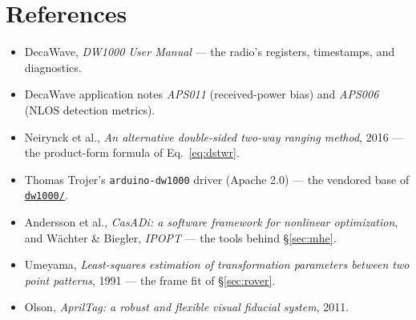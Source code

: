 \documentclass[11pt,a4paper]{article}
\newcommand{\ghdir}[2]{\href{https://github.com/AdershM-2/UWB_3/tree/main/#1}{\texttt{#2}}}
\newcommand{\code}[1]{\texttt{#1}}
\begin{document}
\section*{References}
\begin{itemize}
\item DecaWave, \emph{DW1000 User Manual} --- the radio's registers, timestamps,
      and diagnostics.
\item DecaWave application notes \emph{APS011} (received-power bias) and
      \emph{APS006} (NLOS detection metrics).
\item Neirynck et al., \emph{An alternative double-sided two-way ranging method},
      2016 --- the product-form formula of Eq.~\eqref{eq:dstwr}.
\item Thomas Trojer's \code{arduino-dw1000} driver (Apache 2.0) --- the vendored
      base of \ghdir{libraries/UwbRtls/src/dw1000}{dw1000/}.
\item Andersson et al., \emph{CasADi: a software framework for nonlinear
      optimization}, and W\"achter \& Biegler, \emph{IPOPT} --- the tools behind
      \S\ref{sec:mhe}.
\item Umeyama, \emph{Least-squares estimation of transformation parameters
      between two point patterns}, 1991 --- the frame fit of \S\ref{sec:rover}.
\item Olson, \emph{AprilTag: a robust and flexible visual fiducial system}, 2011.
\end{itemize}
\end{document}
